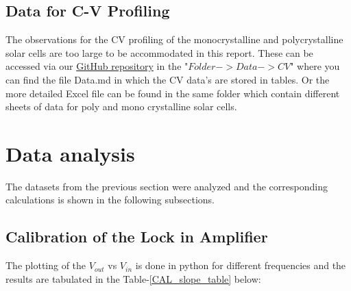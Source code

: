 \documentclass{article}
\begin{document}
\begin{multicols}{2}

\subsection{Data for C-V Profiling}

The observations for the CV profiling of the monocrystalline and polycrystalline solar cells are too large to be accommodated in this report. These can be accessed via our \href{https://github.com/ananthapadmanabhan18/Lock_in_Amplifier_with_ExpEyes.git}{GitHub repository} in the "$Folder->Data->CV$" where you can find the file Data.md in which the CV data's are stored in tables. Or the more detailed Excel file can be found in the same folder which contain different sheets of data for poly and mono crystalline solar cells. 



\section{Data analysis}
The datasets from the previous section were analyzed and the corresponding calculations is shown in the following subsections.




\subsection{Calibration of the Lock in Amplifier}
The plotting of the $V_{out}$ vs $V_{in}$ is done in python for different frequencies and the results are tabulated in the Table-\ref{CAL_slope_table} below:


\begin{table}[H]
    \centering
    \caption{Results from the calibration curve}
    \label{CAL_slope_table}
\end{table}




\end{multicols}
\end{document}
